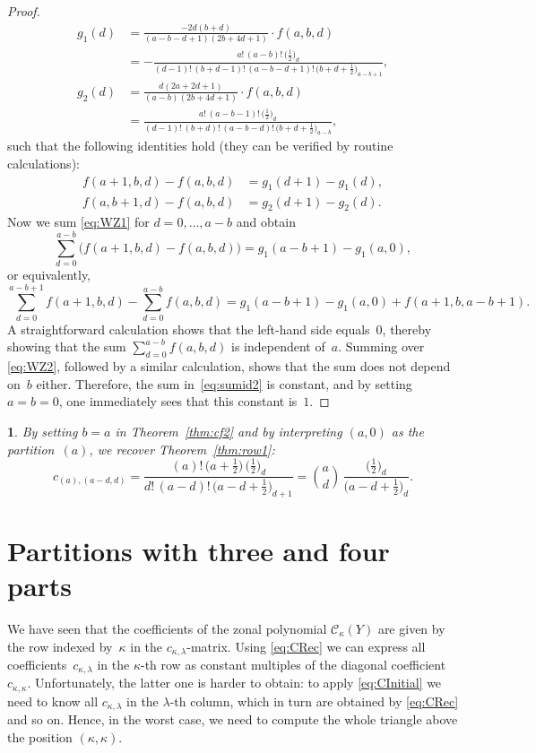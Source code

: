 \documentclass[smallextended]{svjour3}
\newtheorem{rem}[thm]{\protect\remarkname}
\providecommand{\remarkname}{Remark}
\begin{document}
\begin{proof}
  \begin{align*}
    g_1(d) &= \frac{-2d(b+d)}{(a-b-d+1)(2b+4d+1)}\cdot f(a,b,d) \\
    &= -\frac{a! \, (a-b)! \, \bigl(\frac12\bigr)_{\!d}}{(d-1)! \, (b+d-1)! \, (a-b-d+1)! \, \bigl(b+d+\frac12\bigr)_{\!a-b+1}}, \\
    g_2(d) &= \frac{d(2a+2d+1)}{(a-b)(2b+4d+1)} \cdot f(a,b,d)\\
  &= \frac{a! \, (a-b-1)! \, \bigl(\frac12\bigr)_{\!d}}{(d-1)! \, (b+d)! \, (a-b-d)! \, \bigl(b+d+\frac12\bigr)_{\!a-b}},
  \end{align*}
  such that the following identities hold (they can be verified by routine
  calculations):
  \begin{align}
    f(a+1,b,d)-f(a,b,d) &= g_1(d+1) - g_1(d), \label{eq:WZ1} \\
    f(a,b+1,d)-f(a,b,d) &= g_2(d+1) - g_2(d). \label{eq:WZ2}
  \end{align}
  Now we sum \eqref{eq:WZ1} for $d=0,\dots,a-b$ and obtain
  \[
    \sum_{d=0}^{a-b}\bigl(f(a+1,b,d)-f(a,b,d)\bigr) = g_1(a-b+1) - g_1(a,0),
  \]
  or equivalently,
  \[
    \sum_{d=0}^{a-b+1}f(a+1,b,d) - \sum_{d=0}^{a-b}f(a,b,d) = g_1(a-b+1) - g_1(a,0) + f(a+1,b,a-b+1).
  \]
  A straightforward calculation shows that the left-hand side equals~$0$,
  thereby showing that the sum $\sum_{d=0}^{a-b}f(a,b,d)$ is independent
  of~$a$. Summing over \eqref{eq:WZ2}, followed by a similar calculation,
  shows that the sum does not depend on~$b$ either. Therefore, the sum
  in~\eqref{eq:sumid2} is constant, and by setting $a=b=0$, one immediately
  sees that this constant is~$1$.
\end{proof}

\begin{rem}
  By setting $b=a$ in Theorem~\ref{thm:cf2} and by interpreting $(a,0)$ as the
  partition~$(a)$, we recover Theorem~\ref{thm:row1}:
  \[
    c_{(a),(a-d,d)} = 
    \frac{(a)! \, \bigl(a+\frac12\bigr) \, \bigl(\frac12\bigr)_{\!d}}
         {d! \, (a-d)! \, \bigl(a-d+\frac12\bigr)_{\!d+1}} =
    \binom{a}{d} \, \frac{\bigl(\frac12\bigr)_{\!d}}{\bigl(a-d+\frac12\bigr)_{\!d}}.
  \]
\end{rem}



\section{Partitions with three and four parts}\label{sec:3+4parts}

We have seen that the coefficients of the zonal polynomial $\mathcal{C}_\kappa(Y)$ are
given by the row indexed by~$\kappa$ in the $c_{\kappa,\lambda}$-matrix. Using
\eqref{eq:CRec} we can express all coefficients~$c_{\kappa,\lambda}$ in the
$\kappa$-th row as constant multiples of the diagonal
coefficient~$c_{\kappa,\kappa}$.  Unfortunately, the latter one is harder to
obtain: to apply \eqref{eq:CInitial} we need to know all $c_{\kappa,\lambda}$
in the $\lambda$-th column, which in turn are obtained by \eqref{eq:CRec} and
so on. Hence, in the worst case, we need to compute the whole triangle above
the position $(\kappa,\kappa)$.
\end{document}

